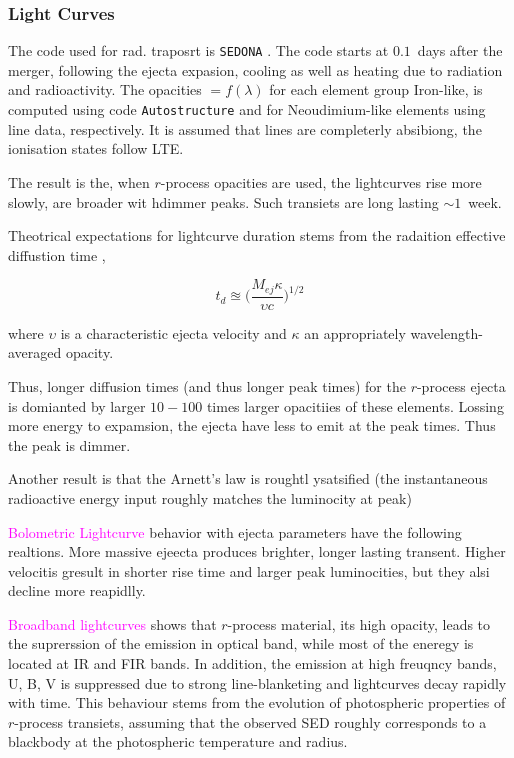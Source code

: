 \documentclass[11pt,a4paper,headinclude=true,DIV=14,BCOR=8mm,chapterprefix,listof=totoc,twoside,openright,abstracton]{scrbook}
\newcommand{\magenta}[1]{\textcolor{magenta}{#1}} %
\begin{document}

\subsubsection{Light Curves}

The code used for rad. traposrt is \texttt{SEDONA} \cite{(Kasen et al. 2006}. The code starts at $0.1$~days after the merger, following the ejecta expasion, cooling as well as heating due to radiation and radioactivity. The opacities $=f(\lambda)$ for each element group Iron-like,  is computed using code \texttt{Autostructure} and for Neoudimium-like elements using \cite{Kurucz & Bell (1995a)} line data, respectively.
It is assumed that lines are completerly absibiong, the ionisation states follow LTE.

The result is the, when $r$-process opacities are used, the lightcurves rise more slowly, are broader wit hdimmer peaks. Such transiets are long lasting $\sim 1$~week.

Theotrical expectations for lightcurve duration stems from the radaition effective diffustion time \cite{(Arnett 1979)},

\begin{equation}
    t_d \approxeq \Big( \frac{M_{ej} \kappa}{ \upsilon c} \Big)^{1/2}
\end{equation}

where $\upsilon$ is a characteristic ejecta velocity and $\kappa$ an appropriately wavelength-averaged opacity.

Thus, longer diffusion times (and thus longer peak times) for the $r$-process ejecta is domianted by larger $10-100$ times larger opacitiies of these elements. Lossing more energy to expamsion, the ejecta have less to emit at the peak times. Thus the peak is dimmer. 

Another result is that the Arnett's law is roughtl ysatsified (the instantaneous radioactive energy input roughly matches the luminocity at peak) \cite{(Arnett 1979, 1982).}

\magenta{Bolometric Lightcurve} behavior with ejecta parameters have the following realtions. More massive ejeecta produces brighter, longer lasting transent. Higher velocitis gresult in shorter rise time and larger peak luminocities, but they alsi decline more reapidlly.

\magenta{Broadband lightcurves} shows that $r$-process material, its high opacity, leads to the suprerssion of the emission in optical band, while most of the eneregy is located at IR and FIR bands. In addition, the emission at high freuqncy bands, U, B, V is suppressed due to strong line-blanketing and lightcurves decay rapidly with time. This behaviour stems from the evolution of photospheric properties of $r$-process transiets, assuming that the observed SED roughly corresponds to a blackbody at the photospheric temperature and radius.
\end{document}
